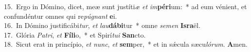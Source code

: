 {15.~}Ergo in Dómino, dicet, meæ sunt justíti\textit{æ} \textit{et} \textit{im}\textbf{pé}\textbf{ri}um:~* ad eum vénient, et confundéntur omnes qui re\textit{pú}\textit{gnant} \textbf{e}i.\\
{16.~}In Dómino justificábi\textit{tur}, \textit{et} \textit{lau}\textbf{dá}\textbf{bi}tur~* omne \textit{se}\textit{men} \textbf{Is}\textbf{ra}ël.\\
{17.~}Glória \textit{Pa}\textit{tri}, \textit{et} \textbf{Fí}\textbf{li}o,~* et Spirí\textit{tu}\textit{i} \textbf{San}cto.\\
{18.~}Sicut erat in princípio, \textit{et} \textit{nunc}, \textit{et} \textbf{sem}per,~* et in sǽcula sæcu\textit{ló}\textit{rum}. \textbf{A}men.\\

